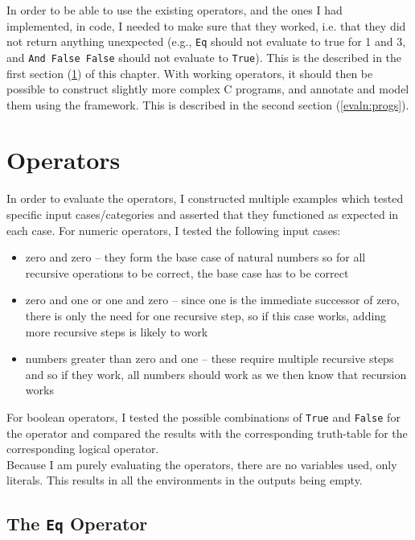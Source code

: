 In order to be able to use the existing operators, and the ones I had implemented, in code, I needed to make sure that they worked, i.e. that they did not return anything unexpected (e.g., \texttt{Eq} should not evaluate to true for 1 and 3, and \texttt{And False False} should not evaluate to \texttt{True}). This is the described in the first section (\ref{evaln:ops}) of this chapter. With working operators, it should then be possible to construct slightly more complex C programs, and annotate and model them using the framework. This is described in the second section (\ref{evaln:progs}).


\section{Operators}\label{evaln:ops}
    In order to evaluate the operators, I constructed multiple examples which tested specific input cases/categories and asserted that they functioned as expected in each case. For numeric operators, I tested the following input cases:
    \begin{itemize}
        \item zero and zero -- they form the base case of natural numbers so for
              all recursive operations to be correct, the base case has to be correct
        \item zero and one or one and zero -- since one is the immediate
              successor of zero, there is only the need for one recursive step,
              so if this case works, adding more recursive steps is likely to 
              work
        \item numbers greater than zero and one -- these require multiple 
              recursive steps and so if they work, all numbers should work as
              we then know that recursion works
    \end{itemize}
    
    For boolean operators, I tested the possible combinations of \texttt{True} and \texttt{False} for the operator and compared the results with the corresponding truth-table for the corresponding logical operator.
    \\
    
    Because I am purely evaluating the operators, there are no variables used, only literals. This results in all the environments in the \Idris outputs being empty.
	
    \subsection{The \texttt{Eq} Operator}\label{evaln:ops:eq}
        
        
